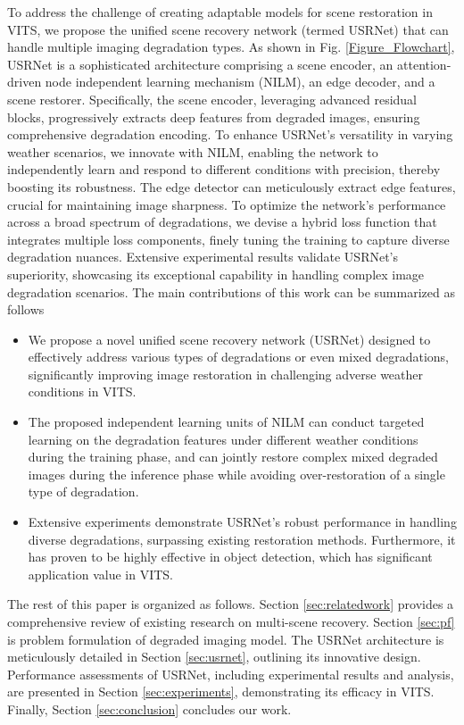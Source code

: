 \documentclass[final,12pt]{elsarticle}
\begin{document}
    To address the challenge of creating adaptable models for scene restoration in VITS, we propose the unified scene recovery network (termed USRNet) that can handle multiple imaging degradation types. As shown in Fig. \ref{Figure_Flowchart}, USRNet is a sophisticated architecture comprising a scene encoder, an attention-driven node independent learning mechanism (NILM), an edge decoder, and a scene restorer. Specifically, the scene encoder, leveraging advanced residual blocks, progressively extracts deep features from degraded images, ensuring comprehensive degradation encoding. To enhance USRNet's versatility in varying weather scenarios, we innovate with NILM, enabling the network to independently learn and respond to different conditions with precision, thereby boosting its robustness. The edge detector can meticulously extract edge features, crucial for maintaining image sharpness. To optimize the network's performance across a broad spectrum of degradations, we devise a hybrid loss function that integrates multiple loss components, finely tuning the training to capture diverse degradation nuances. Extensive experimental results validate USRNet's superiority, showcasing its exceptional capability in handling complex image degradation scenarios. The main contributions of this work can be summarized as follows
%
    \begin{itemize}
        \item  We propose a novel unified scene recovery network (USRNet) designed to effectively address various types of degradations or even mixed degradations, significantly improving image restoration in challenging adverse weather conditions in VITS.

        \item  The proposed independent learning units of NILM can conduct targeted learning on the degradation features under different weather conditions during the training phase, and can jointly restore complex mixed degraded images during the inference phase while avoiding over-restoration of a single type of degradation.

        \item  Extensive experiments demonstrate USRNet's robust performance in handling diverse degradations, surpassing existing restoration methods. Furthermore, it has proven to be highly effective in object detection, which has significant application value in VITS.
    \end{itemize}    
%

    The rest of this paper is organized as follows. Section \ref{sec:relatedwork} provides a comprehensive review of existing research on multi-scene recovery. Section \ref{sec:pf} is problem formulation of degraded imaging model. The USRNet architecture is meticulously detailed in Section \ref{sec:usrnet}, outlining its innovative design. Performance assessments of USRNet, including experimental results and analysis, are presented in Section \ref{sec:experiments}, demonstrating its efficacy in VITS. Finally, Section \ref{sec:conclusion} concludes our work.
%
\end{document}
